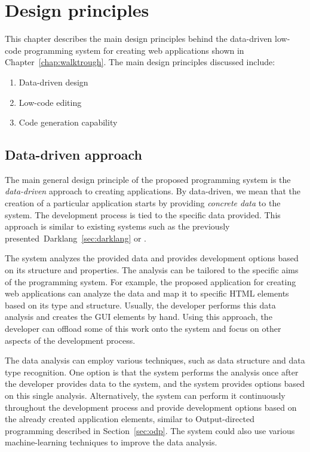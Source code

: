 \chapter{Design principles}
\label{chap:design}

This chapter describes the main design principles behind the data-driven low-code programming system for creating web applications shown in Chapter~\ref{chap:walktrough}.
The main design principles discussed include:
\begin{enumerate}
	\item Data-driven design
	\item Low-code editing
	\item Code generation capability
\end{enumerate}

\section{Data-driven approach}

The main general design principle of the proposed programming system is the \emph{data-driven} approach to creating applications.
By data-driven, we mean that the creation of a particular application starts by providing \emph{concrete data} to the system.
The development process is tied to the specific data provided.
This approach is similar to existing systems such as the previously presented~Darklang~\ref{sec:darklang} or \citet{mendix}.

The system analyzes the provided data and provides development options based on its structure and properties.
The analysis can be tailored to the specific aims of the programming system.
For example, the proposed application for creating web applications can analyze the data and map it to specific HTML elements based on its type and structure.
Usually, the developer performs this data analysis and creates the GUI elements by hand.
Using this approach, the developer can offload some of this work onto the system and focus on other aspects of the development process.

The data analysis can employ various techniques, such as data structure and data type recognition.
One option is that the system performs the analysis once after the developer provides data to the system, and the system provides options based on this single analysis.
Alternatively, the system can perform it continuously throughout the development process and provide development options based on the already created application elements, similar to Output-directed programming described in Section~\ref{sec:odp}.
The system could also use various machine-learning techniques to improve the data analysis.

